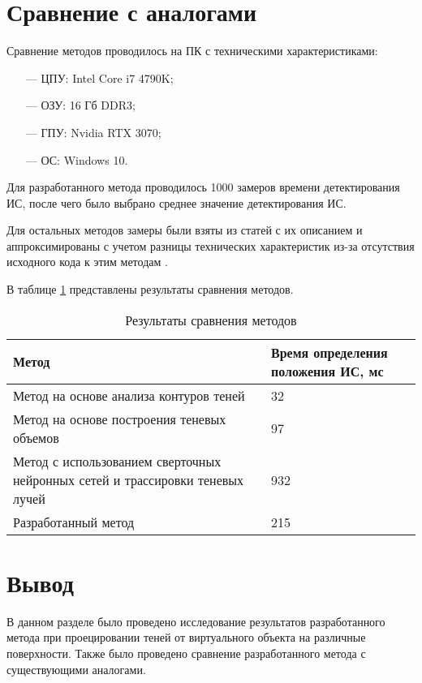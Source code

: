 \section{Сравнение с аналогами}

Сравнение методов проводилось на ПК с техническими характеристиками:

\begin{itemize}
	\item[---] ЦПУ: Intel Core i7 4790K;
	\item[---] ОЗУ: 16 Гб DDR3;
	\item[---] ГПУ: Nvidia RTX 3070;
	\item[---] ОС: Windows 10.
\end{itemize}

Для разработанного метода проводилось 1000 замеров времени детектирования ИС, после чего было выбрано среднее значение детектирования ИС.

Для остальных методов замеры были взяты из статей с их описанием и аппроксимированы с учетом разницы технических характеристик из-за отсутствия исходного кода к этим методам \cite{shadow_contours_method} \cite{THOMASIAN2022385} \cite{sns_tras}.

В таблице \ref{CompareMethods} представлены результаты сравнения методов.

\begin{table}[H]
	\caption{Результаты сравнения методов}
	\label{CompareMethods}
	\begin{center}
		\begin{tabular}{| p{6 cm} | p{5 cm} |} 
			\hline
			Метод & Время определения положения ИС, мс \\
			\hline
			Метод на основе анализа контуров теней & 32 \\
			\hline
			Метод на основе построения теневых объемов & 97 \\
			\hline
			Метод с использованием сверточных нейронных сетей и трассировки теневых лучей & 932 \\
			\hline
			Разработанный метод & 215 \\
			\hline
		\end{tabular}
	\end{center}
\end{table}

\section{Вывод}

В данном разделе было проведено исследование результатов разработанного метода при проецировании теней от виртуального объекта на различные поверхности. Также было проведено сравнение разработанного метода с существующими аналогами.

